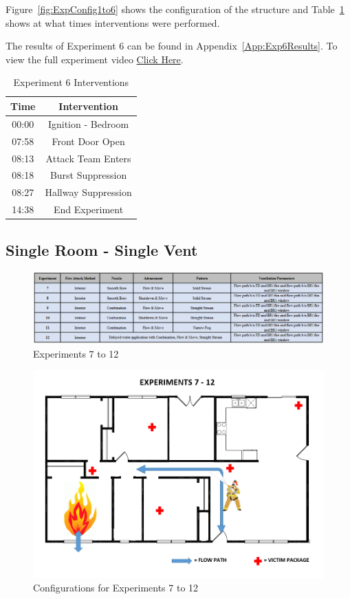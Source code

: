 \documentclass[12pt,oneside]{book}
\begin{document}
Figure~\ref{fig:ExpConfig1to6} shows the configuration of the structure and Table~\ref{Table:Exp6Interventions} shows at what times interventions were performed. 

The results of Experiment 6 can be found in Appendix~\ref{App:Exp6Results}. To view the full experiment video \href{https://youtu.be/gl8rc1Nsl1k}{Click Here}.

\begin{table}[H]
	\centering
	\caption{Experiment 6 Interventions}
	\begin{tabular}{|c|c|} 
		\hline
		Time & Intervention \\ \hline \hline
		00:00 & Ignition - Bedroom \\ \hline
		07:58 & Front Door Open \\ \hline
		08:13 & Attack Team Enters\\ \hline
		08:18 & Burst Suppression \\ \hline 
		08:27 & Hallway Suppression \\ \hline
		14:38 & End Experiment\\ \hline
	\end{tabular}
	\label{Table:Exp6Interventions}
\end{table}

\clearpage

\subsection{Single Room - Single Vent}

\begin{figure}[H]
	\centering
	\includegraphics[width=7in]{Figures/General/Exp7to12.png}
	\caption{Experiments 7 to 12}
	\label{fig:Exp7to12}
\end{figure}

\begin{figure}[H]
	\centering
	\includegraphics[width=5in]{Figures/General/Exps7through12.png}
	\caption{Configurations for Experiments 7 to 12}
	\label{fig:ExpConfig7to12}
\end{figure}
\end{document}
